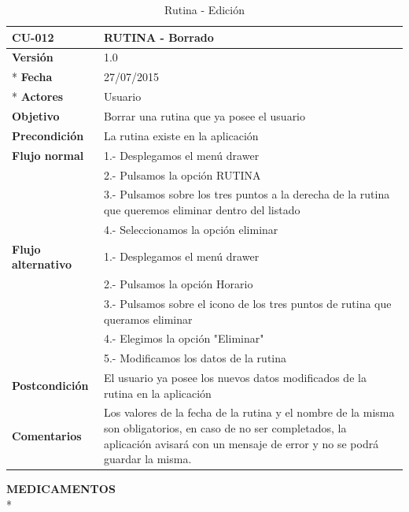 \documentclass[../pfc.tex]{subfiles}
\begin{document}
		\begin{table}[H]
			\centering
			\begin{tabular}[t]{|p{3cm}|p{9.5cm}|}
				\hline \textbf{CU-012} & \textbf{RUTINA - Borrado} \\*
				\hline\hline \textbf{Versión} & 1.0 \\ *
				\hline\hline \textbf{Fecha} & 27/07/2015 \\ *
				\hline\textbf{Actores} 	& Usuario\\*
				\hline \textbf{Objetivo} & Borrar una rutina que ya posee el usuario\\* 			
				\hline \textbf{Precondición} & La rutina existe en la aplicación\\* 
				\hline \textbf{Flujo normal} & 1.- Desplegamos el menú drawer \\* 
				& 2.- Pulsamos la opción RUTINA\\*	
				& 3.- Pulsamos sobre los tres puntos a la derecha de la rutina que queremos eliminar dentro del listado\\*	
				& 4.- Seleccionamos la opción eliminar\\*	
				\hline \textbf{Flujo alternativo} & 1.- Desplegamos el menú drawer \\* 
				& 2.- Pulsamos la opción Horario \\*	
				& 3.- Pulsamos sobre el icono de los tres puntos de rutina que queramos eliminar \\*	
				& 4.- Elegimos la opción "Eliminar"\\*	
				& 5.- Modificamos los datos de la rutina\\*	
				\hline \textbf{Postcondición} & El usuario ya posee los nuevos datos modificados de la rutina en la aplicación \\* 
				\hline \textbf{Comentarios}   & Los valores de la fecha de la rutina y el nombre de la misma son obligatorios, en caso de no ser completados, la aplicación avisará con un mensaje de error y no se podrá guardar la misma.\\*
				\hline
			\end{tabular}
			\caption{Rutina - Edición}
			\label{tabla:caso012}
		\end{table}

	

	

	
		
		
		
		\textbf{MEDICAMENTOS}\\*
		
\end{document}
